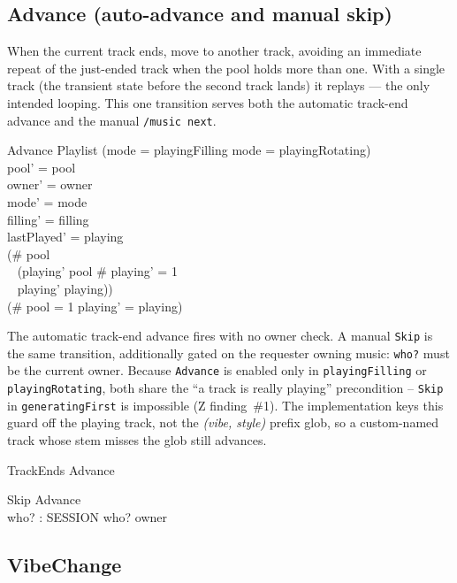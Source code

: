 \documentclass[a4paper,10pt,fleqn]{article}
\begin{document}
\subsection{Advance (auto-advance and manual skip)}

When the current track ends, move to another track, avoiding an
immediate repeat of the just-ended track when the pool holds more than
one. With a single track (the transient state before the second track
lands) it replays --- the only intended looping. This one transition
serves both the automatic track-end advance and the manual
\texttt{/music next}.

\begin{schema}{Advance}
  \Delta Playlist
  \where
  (mode = playingFilling \lor mode = playingRotating) \\
  pool' = pool \\
  owner' = owner \\
  mode' = mode \\
  filling' = filling \\
  lastPlayed' = playing \\
  (\# pool  \implies \\
    \quad~ (playing' \subseteq pool \land \# playing' = 1 \\
  \quad~ \land playing' \neq playing)) \\
  (\# pool = 1 \implies playing' = playing)
\end{schema}

The automatic track-end advance fires with no owner check. A manual
\texttt{Skip} is the same transition, additionally gated on the requester
owning music: \texttt{who?} must be the current owner. Because
\texttt{Advance} is enabled only in \texttt{playingFilling} or
\texttt{playingRotating}, both share the ``a track is really playing''
precondition -- \texttt{Skip} in \texttt{generatingFirst} is impossible
(Z finding~\#1). The implementation keys this guard off the playing track,
not the \emph{(vibe, style)} prefix glob, so a custom-named track whose stem
misses the glob still advances.

\begin{zed}
  TrackEnds  Advance
\end{zed}

\begin{schema}{Skip}
  Advance \\
  who? : SESSION
  \where
  who? \in owner
\end{schema}

\subsection{VibeChange}
\end{document}
